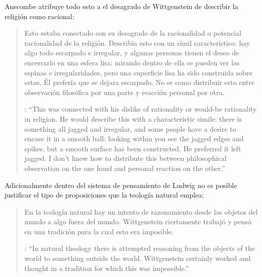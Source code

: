   Anscombe atribuye todo esto a el desagrado de Wittgenstein de describir la religión como racional: \blockquote[{\cite[122]{anscombe1981parmenides:qli}}: \enquote{This was connected with his dislike of rationality or would-be rationality in religion. He would describe this with a characteristic simile: there is something all jagged and irregular, and some people have a desire to encase it in a smooth ball: looking within you see the jagged edges and spikes, but a smooth surface has been constructed. He preferred it left jagged. I don't know how to distribute this between philosophical observation on the one hand and personal reaction on the other.}]{Esto estaba conectado con su desagrado de la racionalidad o potencial racionalidad de la religión. Describía esto con un símil característico: hay algo todo escarpado e irregular, y algunas personas tienen el deseo de encerrarlo en una esfera lisa: mirando dentro de ella se pueden ver las espinas e irregularidades, pero una superficie lisa ha sido construida sobre estas. Él prefería que se dejara escarpado. No se como distribuir esto entre observación filosófica por una parte y reacción personal por otra.} Adicionalmente dentro del sistema de pensamiento de Ludwig no es posible justificar el tipo de proposiciones que la teología natural emplea: \blockquote[{\cite[123]{anscombe1981parmenides:qli}}: \enquote{In natural theology there is attempted reasoning from the objects of the world to something outside the world. Wittgenstein certainly worked and thought in a tradition for which this was impossible.}]{En la teología natural hay un intento de razonamiento desde los objetos del mundo a algo fuera del mundo. Wittgenstein ciertamente trabajó y pensó en una tradición para la cual esto era imposible.}

